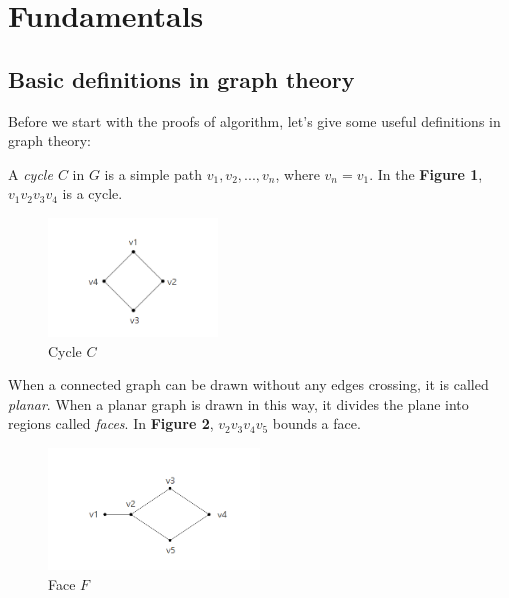 \section{Fundamentals}
\subsection{Basic definitions in graph theory}
Before we start with the proofs of algorithm, let's give some useful definitions in graph theory:

\begin{definition}
A \textit{cycle $C$} in $G$ is a simple path $v_1, v_2, ..., v_n$, where $v_n = v_1$. In the \textbf{Figure 1}, $v_1v_2v_3v_4$ is a cycle.
\begin{figure}[H] %
\centering %
\includegraphics[width=0.4\textwidth]{figure/cycle.png} 
\caption{Cycle $C$} %
\label{figure} %
\end{figure}
\end{definition}

\begin{definition}
When a connected graph can be drawn without any edges crossing, it is called \textit{planar}. When a planar graph is drawn in this way, it divides the plane into regions called \textit{faces}. \cite{Discrete_Mathematics} In \textbf{Figure 2}, $v_2v_3v_4v_5$ bounds a face. 
\begin{figure}[H] %
\centering %
\includegraphics[width=0.5\textwidth]{figure/face.png} 
\caption{Face $F$} %
\label{figure} %
\end{figure}
\end{definition}

